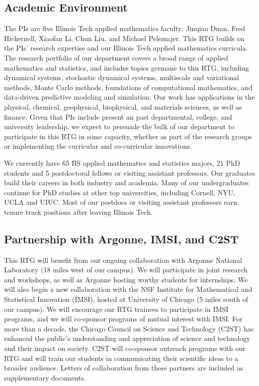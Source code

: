 \documentclass[11pt]{NSFamsart}
\newcommand{\numUG}{65\xspace}
\newcommand{\numPhD}{21\xspace}
\newcommand{\numPostDoc}{5\xspace}
\begin{document}
\subsection*{Academic Environment} The PIs are five Illinois Tech applied mathematics faculty:  Jinqiao Duan, Fred Hickernell, Xiaofan Li, Chun Liu, and Michael Pelsmajer. This RTG builds on the PIs' research expertise and our Illinois Tech applied mathematics curricula.  The research portfolio of our department covers a broad range of applied mathematics and statistics, and includes topics germane to this RTG, including dynamical systems, stochastic dynamical systems, multiscale and variational methods,  Monte Carlo methods, foundations of computational mathematics, and data-driven predictive modeling and simulation. Our work has applications in the physical, chemical, geophysical, biophysical, and materials sciences, as well as finance.  Given that PIs include present an past departmental, college, and university leadership, we expect to persuade the bulk of our department to participate in this RTG in some capacity, whether as part of the research groups or implementing the curricular and co-curricular innovations.

We currently have \numUG BS applied mathematics and statistics majors,   \numPhD PhD students and   \numPostDoc postdoctoral fellows or visiting assistant professors. Our graduates build their careers in  both industry  and academia. Many of our undergraduates continue for PhD studies at other top universities, including Cornell, NYU, UCLA and UIUC. Most of our postdocs or visiting assistant professors earn tenure track positions after leaving Illinois Tech.



\subsection*{Partnership with Argonne, IMSI, and C2ST}
This RTG will benefit from our ongoing collaboration with Argonne National Laboratory (18 miles west of our campus). We will participate in joint research and workshops, as well as Argonne hosting worthy students for internships.  We will also begin a new collaboration with the NSF Institute for Mathematical and Statistical Innovation (IMSI), hosted at University of Chicago (5 miles south of our campus). We will encourage our RTG trainees to participate in IMSI programs, and we will co-sponsor programs of mutual interest with IMSI.  For more than a decade, the Chicago Council on Science and Technology (C2ST) has enhanced the public’s understanding and appreciation of science and technology and their impact on society. C2ST will co-sponsor outreach programs with our RTG and will train our students in communicating their scientific ideas to a broader audience. Letters of collaboration from these partners are included as supplementary documents.
 
\end{document}
